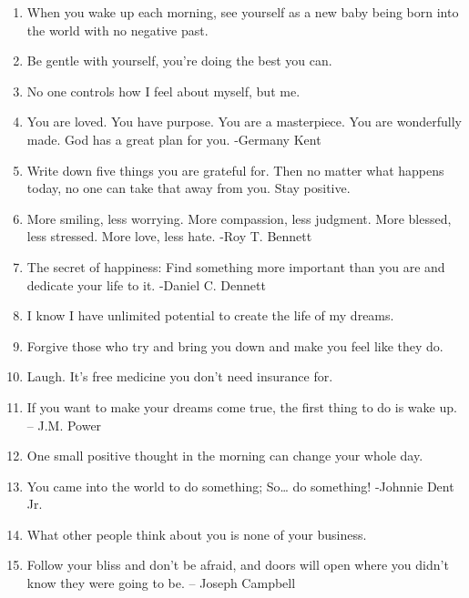 \begin{enumerate}
            \item When you wake up each morning, see yourself as a new baby being born into the world with no negative past.

            \item Be gentle with yourself, you’re doing the best you can.

            \item No one controls how I feel about myself, but me.

            \item You are loved. You have purpose. You are a masterpiece. You are wonderfully made. God has a great plan for you. -Germany Kent

            \item Write down five things you are grateful for. Then no matter what happens today, no one can take that away from you. Stay positive.

            \item More smiling, less worrying. More compassion, less judgment. More blessed, less stressed. More love, less hate. -Roy T. Bennett

            \item The secret of happiness: Find something more important than you are and dedicate your life to it. -Daniel C. Dennett

            \item I know I have unlimited potential to create the life of my dreams.

            \item Forgive those who try and bring you down and make you feel like they do.

            \item Laugh. It’s free medicine you don’t need insurance for.

            \item If you want to make your dreams come true, the first thing to do is wake up. – J.M. Power

            \item One small positive thought in the morning can change your whole day.

            \item You came into the world to do something; So… do something! -Johnnie Dent Jr.

            \item What other people think about you is none of your business.

            \item Follow your bliss and don’t be afraid, and doors will open where you didn’t know they were going to be. – Joseph Campbell


\end{enumerate}
